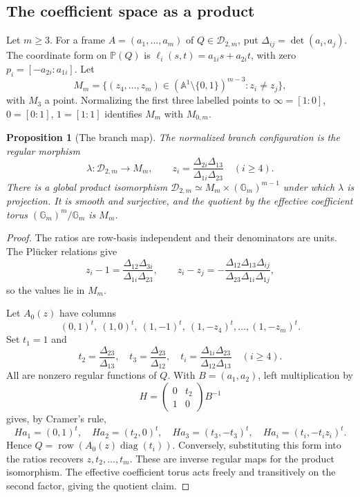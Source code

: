 \documentclass[11pt]{article}
\newcommand{\PP}{\mathbb P}
\newcommand{\A}{\mathbb A}
\newcommand{\Gm}{\mathbb G_m}
\newcommand{\D}{\mathcal D}
\theoremstyle{plain}
\newtheorem{proposition}[theorem]{Proposition}
\theoremstyle{definition}
\theoremstyle{remark}
\numberwithin{equation}{section}
\begin{document}
\subsection{The coefficient space as a product}
Let \(m\geq3\).  For a frame \(A=(a_1,\ldots,a_m)\) of
\(Q\in\D_{2,m}\), put \(\Delta_{ij}=\det(a_i,a_j)\).
The coordinate form on \(\PP(Q)\) is
\(\ell_i(s,t)=a_{1i}s+a_{2i}t\), with zero
\(p_i=[-a_{2i}:a_{1i}]\).  Let
\[
 M_m=\{(z_4,\ldots,z_m)\in(\A^1\setminus\{0,1\})^{m-3}:
 z_i\ne z_j\},
\]
with \(M_3\) a point.  Normalizing the first three labelled points
to \(\infty=[1:0]\), \(0=[0:1]\), \(1=[1:1]\) identifies
\(M_m\) with \(M_{0,m}\).

\begin{proposition}[The branch map]\label{prop:parameter}
The normalized branch configuration is the regular morphism
\[
 \lambda:\D_{2,m}\to M_m,\qquad
 z_i=\frac{\Delta_{2i}\Delta_{13}}{\Delta_{1i}\Delta_{23}}
 \quad(i\geq4).
\]
There is a global product isomorphism
\(\D_{2,m}\simeq M_m\times(\Gm)^{m-1}\) under which \(\lambda\)
is projection.  It is smooth and surjective, and the quotient by
the effective coefficient torus \((\Gm)^m/\Gm\) is \(M_m\).
\end{proposition}
\begin{proof}
The ratios are row-basis independent and their denominators are
units.  The Pl\"ucker relations give
\[
 z_i-1=\frac{\Delta_{12}\Delta_{3i}}{\Delta_{1i}\Delta_{23}},
 \qquad
 z_i-z_j=-\frac{\Delta_{12}\Delta_{13}\Delta_{ij}}
 {\Delta_{23}\Delta_{1i}\Delta_{1j}},
\]
so the values lie in \(M_m\).

Let \(A_0(z)\) have columns
\[
 (0,1)^t,\ (1,0)^t,\ (1,-1)^t,\
 (1,-z_4)^t,\ldots,(1,-z_m)^t.
\]
Set \(t_1=1\) and
\[
 t_2=\frac{\Delta_{23}}{\Delta_{13}},\quad
 t_3=\frac{\Delta_{23}}{\Delta_{12}},\quad
 t_i=\frac{\Delta_{1i}\Delta_{23}}{\Delta_{12}\Delta_{13}}
 \quad(i\geq4).
\]
All are nonzero regular functions of \(Q\).  With \(B=(a_1,a_2)\),
left multiplication by
\[
 H=\begin{pmatrix}0&t_2\\1&0\end{pmatrix}B^{-1}
\]
gives, by Cramer's rule,
\[
 Ha_1=(0,1)^t,\quad Ha_2=(t_2,0)^t,\quad
 Ha_3=(t_3,-t_3)^t,\quad Ha_i=(t_i,-t_i z_i)^t .
\]
Hence \(Q=\operatorname{row}(A_0(z)\operatorname{diag}(t_i))\).
Conversely, substituting this form into the ratios recovers
\(z,t_2,\ldots,t_m\).  These are inverse regular maps for the
product isomorphism.  The effective coefficient torus acts freely
and transitively on the second factor, giving the quotient claim.
\end{proof}
\end{document}
